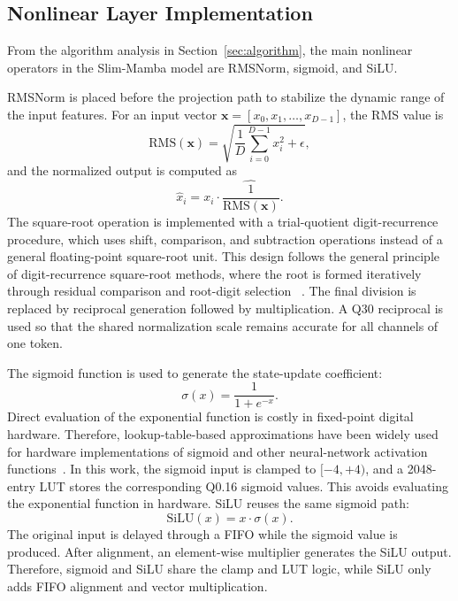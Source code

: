 \documentclass[lettersize,journal]{IEEEtran}
\begin{document}
\subsection{Nonlinear Layer Implementation}

From the algorithm analysis in Section~\ref{sec:algorithm}, the main nonlinear operators in
the Slim-Mamba model are RMSNorm, sigmoid, and SiLU.

RMSNorm is placed before the projection path to stabilize the dynamic range of
the input features. For an input vector
$\mathbf{x}=[x_0,x_1,\ldots,x_{D-1}]$, the RMS value is
\begin{equation}
\mathrm{RMS}(\mathbf{x})=
\sqrt{\frac{1}{D}\sum_{i=0}^{D-1}x_i^2+\epsilon},
\label{eq:rms_value}
\end{equation}
and the normalized output is computed as
\begin{equation}
\hat{x}_i =
x_i \cdot
\widehat{\frac{1}{\mathrm{RMS}(\mathbf{x})}} .
\label{eq:rmsnorm_output}
\end{equation}
The square-root operation is implemented with a trial-quotient digit-recurrence
procedure, which uses shift, comparison, and subtraction operations instead of a
general floating-point square-root unit. This design follows 
the general principle of digit-recurrence square-root methods, where the root is formed iteratively 
through residual comparison and root-digit selection ~\cite{Harris2024Radix4Sqrt,Bruguera2023Radix64Sqrt}. The final 
division is replaced by reciprocal generation followed by multiplication. A Q30 reciprocal 
is used so that the shared normalization scale remains accurate for all channels of one
token.

The sigmoid function is used to generate the state-update coefficient: 
\begin{equation} 
  \sigma(x)=\frac{1}{1+e^{-x}}. \label{eq:sigmoid} 
\end{equation} 
Direct evaluation of the exponential function is costly in fixed-point digital hardware. 
Therefore, lookup-table-based approximations have been widely used for hardware implementations of 
sigmoid and other neural-network activation functions~\cite{Meher2010SigmoidLUT,Piazza1993DigitalLUT}. 
In this work, the sigmoid input is clamped to $[-4,+4)$, and a 2048-entry LUT stores the corresponding Q0.16 sigmoid values. 
This avoids evaluating the exponential function in hardware. SiLU reuses the same sigmoid path:
\begin{equation}
\mathrm{SiLU}(x)=x\cdot\sigma(x).
\label{eq:silu}
\end{equation}
The original input is delayed through a FIFO while the sigmoid value is produced.
After alignment, an element-wise multiplier generates the SiLU output. Therefore,
sigmoid and SiLU share the clamp and LUT logic, while SiLU only adds FIFO
alignment and vector multiplication.
\end{document}
